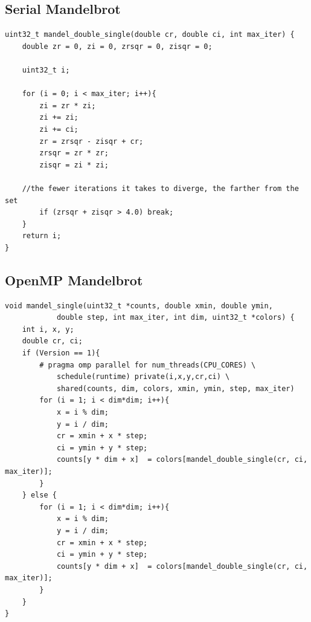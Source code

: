 \documentclass{article}
\begin{document}
        \subsection{Serial Mandelbrot}\label{appendix:serial}
\begin{lstlisting}
uint32_t mandel_double_single(double cr, double ci, int max_iter) {
    double zr = 0, zi = 0, zrsqr = 0, zisqr = 0;

    uint32_t i;

    for (i = 0; i < max_iter; i++){
		zi = zr * zi;
		zi += zi;
		zi += ci;
		zr = zrsqr - zisqr + cr;
		zrsqr = zr * zr;
		zisqr = zi * zi;
		
    //the fewer iterations it takes to diverge, the farther from the set
		if (zrsqr + zisqr > 4.0) break;
    }
    return i;
}
\end{lstlisting}

        \subsection{OpenMP Mandelbrot}\label{appendix:omp}
\begin{lstlisting}
void mandel_single(uint32_t *counts, double xmin, double ymin,
            double step, int max_iter, int dim, uint32_t *colors) {
    int i, x, y;
    double cr, ci;
    if (Version == 1){
        # pragma omp parallel for num_threads(CPU_CORES) \
            schedule(runtime) private(i,x,y,cr,ci) \
            shared(counts, dim, colors, xmin, ymin, step, max_iter)
        for (i = 1; i < dim*dim; i++){
            x = i % dim;
            y = i / dim;
            cr = xmin + x * step;
            ci = ymin + y * step;
            counts[y * dim + x]  = colors[mandel_double_single(cr, ci, max_iter)];
        }
    } else {
        for (i = 1; i < dim*dim; i++){
            x = i % dim;
            y = i / dim;
            cr = xmin + x * step;
            ci = ymin + y * step;
            counts[y * dim + x]  = colors[mandel_double_single(cr, ci, max_iter)];
        }
    }
}
\end{lstlisting}
\end{document}
